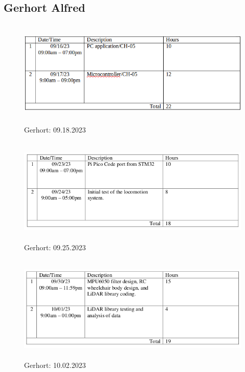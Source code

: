 \documentclass[conference]{IEEEtran}
\begin{document}
\subsection{Gerhort Alfred}
    \begin{figure}[htbp]
                \centerline{\includegraphics[height=2in,keepaspectratio]{figs/I/G_09.18.2023.png}}
                \caption{Gerhort: 09.18.2023}
                \label{Fig:G_09.18.2023}
    \end{figure} 
    \begin{figure}[htbp]
                \centerline{\includegraphics[height=2in,keepaspectratio]{figs/I/G_09.25.2023.png}}
                \caption{Gerhort: 09.25.2023}
                \label{Fig:G_09.25.2023}
    \end{figure} 
    \begin{figure}[htbp]
                \centerline{\includegraphics[height=2in,keepaspectratio]{figs/I/G_10.02.2023.png}}
                \caption{Gerhort: 10.02.2023}
                \label{Fig:G_10.02.2023}
    \end{figure} 
\end{document}
